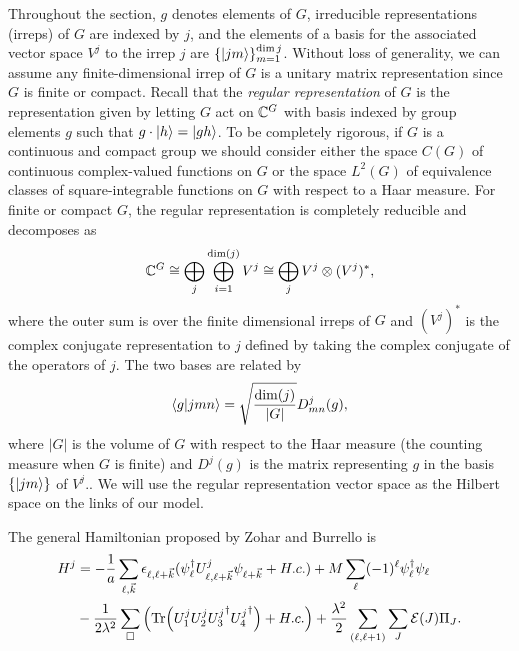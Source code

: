 \documentclass[11pt,reqno]{amsart}
\numberwithin{equation}{section}
\begin{document}
	Throughout the section, $g$ denotes elements of $G$, irreducible representations (irreps) of $G$ are indexed by $j$, and the elements of a basis for the associated vector space $V^j$ to the irrep $j$ are $\{\ket{jm} \}_{m=1}^{\dim j}$.
	Without loss of generality, we can assume any finite-dimensional irrep of $G$ is a unitary matrix representation since $G$ is finite or compact.
	Recall that the \emph{regular representation}  
	of $G$ is the representation given by letting $G$ act on $\mathbb{C}^{G}$ with basis indexed by group elements $g$ such that $g\cdot \ket{h} = \ket{gh}$. 
	To be completely rigorous, if $G$ is a continuous and compact group we should consider either the space $C(G)$ of continuous complex-valued functions on $G$ or the space $L^2(G)$ of equivalence classes of square-integrable functions on $G$ with respect to a Haar measure.
	For finite or compact $G$, the regular representation is completely reducible and decomposes as
	\begin{equation}\label{eq:reg_rep_decomp}
		\mathbb{C}^{G}\cong\bigoplus_j \bigoplus_{i=1}^{\dim (j)} V^j \cong \bigoplus_j V^j \otimes (V^j)^* ,
	\end{equation}
	where the outer sum is over the finite dimensional irreps of $G$ and $(V^j)^*$ is the complex conjugate representation to $j$ defined by taking the complex conjugate of the operators of $j$.
	The two bases are related by
	\begin{equation}\label{eq:group_rep_basis_relation}
		\braket{g}{jmn}=\sqrt{\frac{\dim(j)}{|G|}}D^j_{mn}(g),
	\end{equation}
	where $|G|$ is the volume of $G$ with respect to the Haar measure (the counting measure when $G$ is finite) and $D^j(g)$ is the matrix representing $g$ in the basis $\{\ket{jm}\}$ of $V^j$..
	We will use the regular representation vector space as the Hilbert space on the links of our model.
	
	The general Hamiltonian proposed by Zohar and Burrello is
	\begin{align}\label{eq:zohar_hamiltonian}
	H^j&=-\frac{1}{a}\sum_{\ell,\vec{k}} \epsilon_{\ell,\ell+\vec{k}}(\psi_\ell^\dagger U_{\ell,\ell+\vec{k}}^j\psi_{\ell+\vec{k}}+H.c.) + M\sum_\ell (-1)^\ell \psi_\ell^\dagger\psi_\ell \nonumber\\ 
	&- \frac{1}{2\lambda^2} \sum_{\Box} \left(\Tr(U_1^j U_2^j {U_3^j}^\dagger {U_4^j}^\dagger) + H.c.\right) + \frac{\lambda^2}{2} \sum_{(\ell,\ell+1)} \sum_{J} \mathcal{E}(J)\Pi_J.
	\end{align}
	
\end{document}
